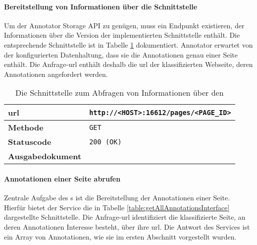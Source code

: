     \paragraph{Bereitstellung von Informationen über die Schnittstelle}
    Um der Annotator Storage API \cite[Kapitel "`Storage"']{annotator:documentation} zu genügen,
    muss ein Endpunkt existieren,
    der Informationen über die Version der implementierten Schnittstelle
    enthält.
    Die entsprechende Schnittstelle ist in Tabelle
    \ref{table:annotationServiceMetaInterface} dokumentiert.
    Annotator erwartet von der konfigurierten Datenhaltung,
    dass sie die Annotationen genau einer Seite enthält.
    Die Anfrage-\gls{url} enthält deshalb die \gls{url} der klassifizierten Webseite,
    deren Annotationen angefordert werden.

    \begin{table}[htb]
        \centering
        \begin{tabular}{|l|l|}
            \hline
            \textbf{\gls{url}} & \texttt{http://<HOST>:16612/pages/<PAGE\_ID>}\\
            \hline
            \textbf{Methode} & \texttt{GET}\\
            \hline
            \textbf{Statuscode} & \texttt{200 (OK)}\\
            \hline
            \textbf{Ausgabedokument} & \\
            \hline
        \end{tabular}
        \caption{Die Schnittstelle zum Abfragen von Informationen über den {\annotationService}}
        \label{table:annotationServiceMetaInterface}
    \end{table}

    \paragraph{Annotationen einer Seite abrufen}
    Zentrale Aufgabe des {\annotationService}s ist die Bereitstellung der Annotationen einer Seite.
    Hierfür bietet der Service die in Tabelle \ref{table:getAllAnnotationsInterface}
    dargestellte Schnittstelle.
    Die Anfrage-\gls{url} identifiziert die klassifizierte Seite,
    an deren Annotationen Interesse besteht,
    über ihre \gls{url}.
    Die Antwort des Services ist ein Array von Annotationen, wie sie im ersten Abschnitt vorgestellt wurden.

